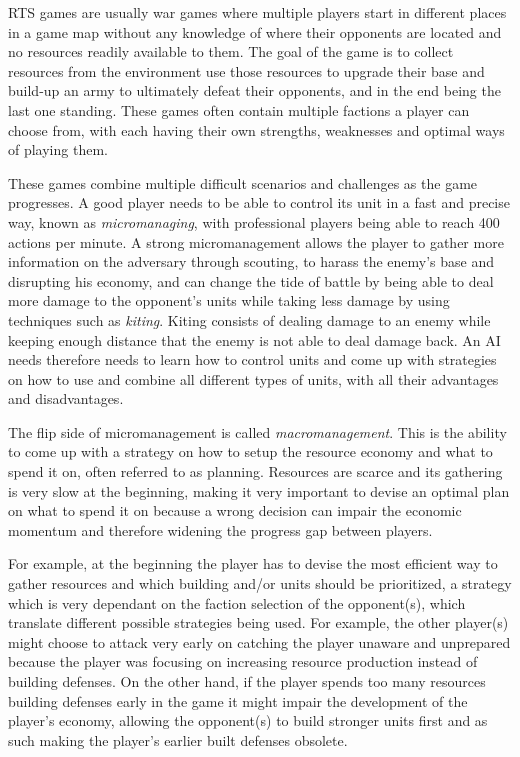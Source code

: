 RTS games are usually war games where multiple players start in different places in a game map without any knowledge of where their opponents are located and no resources readily available to them. The goal of the game is to collect resources from the environment use those resources to upgrade their base and build-up an army to ultimately defeat their opponents, and in the end being the last one standing. These games often contain multiple factions a player can choose from, with each having their own strengths, weaknesses and optimal ways of playing them.

These games combine multiple difficult scenarios and challenges as the game progresses. A good player needs to be able to control its unit in a fast and precise way, known as \textit{micromanaging}, with professional players being able to reach 400 actions per minute\citep{apmwcs}. A strong micromanagement allows the player to gather more information on the adversary through scouting, to harass the enemy's base and disrupting his economy, and can change the tide of battle by being able to deal more damage to the opponent's units while taking less damage by using techniques such as \textit{kiting}. Kiting consists of dealing damage to an enemy while keeping enough distance that the enemy is not able to deal damage back. An AI needs therefore needs to learn how to control units and come up with strategies on how to use and combine all different types of units, with all their advantages and disadvantages.

The flip side of micromanagement is called \textit{macromanagement}. This is the ability to come up with a strategy on how to setup the resource economy and what to spend it on, often referred to as planning. Resources are scarce and its gathering is very slow at the beginning, making it very important to devise an optimal plan on what to spend it on because a wrong decision can impair the economic momentum and therefore widening the progress gap between players.

For example, at the beginning the player has to devise the most efficient way to gather resources and which building and/or units should be prioritized, a strategy which is very dependant on the faction selection of the opponent(s), which translate different possible strategies being used. For example, the other player(s) might choose to attack very early on catching the player unaware and unprepared because the player was focusing on increasing resource production instead of building defenses. On the other hand, if the player spends too many resources building defenses early in the game it might impair the development of the player's economy, allowing the opponent(s) to build stronger units first and as such making the player's earlier built defenses obsolete.

